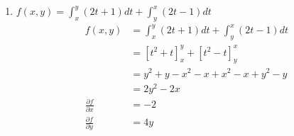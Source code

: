 \begin{enumerate}
    \item $f(x, y)=\displaystyle\int_x^y(2 t+1) d t+\int_y^x(2 t-1) d t$
          \sol{}
          \begin{align*}
              f(x, y)                       & =\int_x^y(2 t+1) d t+\int_y^x(2 t-1) d t              \\
                                            & = \left[t^2 + t\right]_x^y + \left[t^2 - t\right]_y^x \\
                                            & = y^2 + y - x^2 - x + x^2 - x + y^2 - y               \\
                                            & = 2y^2 - 2x                                           \\
              \frac{\partial f}{\partial x} & = -2                                                  \\ \frac{\partial f}{\partial y} &= 4y
          \end{align*}

\end{enumerate}